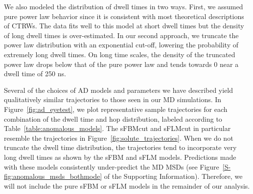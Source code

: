 \documentclass[journal=jctcce,manuscript=article]{achemso}
\begin{document}
  We also modeled the distribution of dwell times in two ways. First, we
  assumed pure power law behavior since it is consistent with most theoretical
  descriptions of CTRWs. The data fits well to this model at short dwell times
  but the density of long dwell times is over-estimated. In our second
  approach, we truncate the power law distribution with an exponential cut-off,
  lowering the probability of extremely long dwell times. 
  On long time scales, the density of the truncated power law drops below that
  of the pure power law and tends towards 0 near a dwell time of 250 ns.
  
  Several of the choices of AD models and parameters we have described yield
  qualitatively similar trajectories to those seen in our MD simulations.  In
  Figure~\ref{fig:ad_eyetest}, we plot representative sample trajectories for
  each combination of the dwell time and hop distribution, labeled according to
  Table~\ref{table:anomalous_models}. The sFBMcut and sFLMcut in particular
  resemble the trajectories in Figure~\ref{fig:solute_trajectories}.  When we
  do not truncate the dwell time distribution, the trajectories tend to
  incorporate very long dwell times as shown by the sFBM and sFLM models.
  Predictions made with these models consistently under-predict the MD MSDs
  (see Figure~\ref{S-fig:anomalous_msds_bothmode} of the Supporting Information).
  Therefore, we will not include the pure sFBM or sFLM models in the
  remainder of our analysis.   
  
\end{document}

